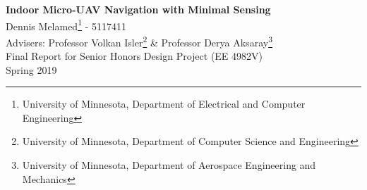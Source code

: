 
\begin{titlepage}
	\begin{center}
		\vspace{20pt}
		{\bf \LARGE Indoor Micro-UAV Navigation with Minimal Sensing} \\
		\vspace{200pt}
		Dennis Melamed\footnote{University of Minnesota, Department of Electrical and Computer Engineering}  - 5117411\\
		Advisers: Professor Volkan Isler\footnote{University of Minnesota, Department of Computer Science and Engineering} \& Professor Derya Aksaray\footnote{University of Minnesota, Department of Aerospace Engineering and Mechanics} \\
		Final Report for Senior Honors Design Project (EE 4982V)\\
		Spring 2019 \\
	\end{center}
\end{titlepage}
